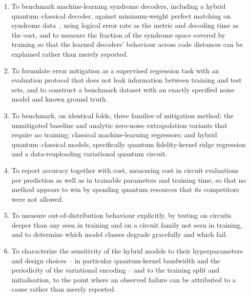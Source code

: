 \documentclass[Thesis.tex]{subfiles}
\begin{document}
\begin{enumerate}
    \item To benchmark machine-learning syndrome decoders, including a hybrid
    quantum--classical decoder, against minimum-weight perfect matching on syndrome
    data~\cite{edmonds1965paths,higgott2022pymatching,torlai2017neural,bausch2024learning},
    using logical error rate as the metric and decoding time as the cost, and to
    measure the fraction of the syndrome space covered by training so that the
    learned decoders' behaviour across code distances can be explained rather than
    merely reported.

    \item To formulate error mitigation as a supervised regression task with an
    evaluation protocol that does not leak information between training and test
    sets, and to construct a benchmark dataset with an exactly specified noise model
    and known ground truth.

    \item To benchmark, on identical folds, three families of mitigation method: the
    unmitigated baseline and analytic zero-noise extrapolation variants that require
    no training; classical machine-learning regressors; and hybrid
    quantum--classical models, specifically quantum fidelity-kernel ridge regression
    and a data-reuploading variational quantum circuit.

    \item To report accuracy together with cost, measuring cost in circuit
    evaluations per prediction as well as in trainable parameters and training time,
    so that no method appears to win by spending quantum resources that its
    competitors were not allowed.

    \item To measure out-of-distribution behaviour explicitly, by testing on circuits
    deeper than any seen in training and on a circuit family not seen in training,
    and to determine which model classes degrade gracefully and which fail.

    \item To characterize the sensitivity of the hybrid models to their
    hyperparameters and design choices -- in particular quantum-kernel bandwidth and
    the periodicity of the variational encoding -- and to the training split and
    initialisation, to the point where an observed failure can be attributed to a
    cause rather than merely reported.
\end{enumerate}
\end{document}
